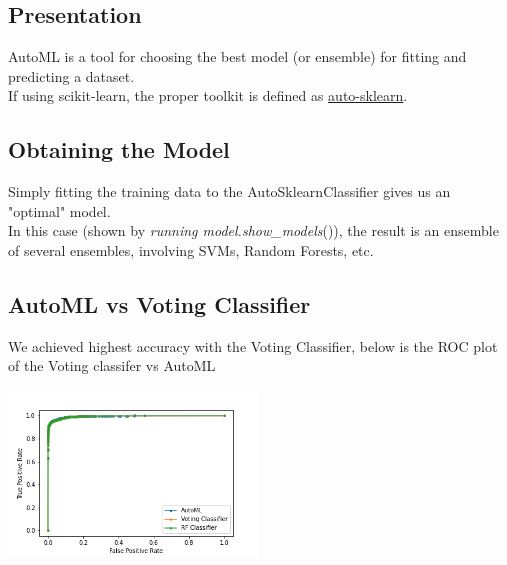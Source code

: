 \subsection{Presentation}
AutoML is a tool for choosing the best model (or ensemble) for fitting and predicting a dataset.\\
If using scikit-learn, the proper toolkit is defined as \href{https://automl.github.io/auto-sklearn/}{auto-sklearn}.

\subsection{Obtaining the Model}
Simply fitting the training data to the AutoSklearnClassifier gives us an "optimal" model.\\
In this case (shown by \emph{running model.show\_models}()), the result is an ensemble of several ensembles, involving SVMs, Random Forests, etc.

\subsection{AutoML vs Voting Classifier}
We achieved highest accuracy with the Voting Classifier, below is the ROC plot of the Voting classifer vs AutoML

\begin{center}
    \captionsetup{type=figure}
    \includegraphics[width=250px]{AUC_automl.png}
\end{center}